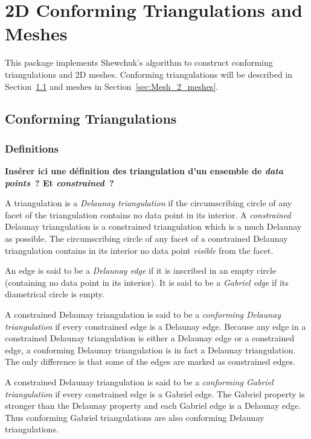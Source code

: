 \chapter{2D Conforming Triangulations and Meshes}
\label{user_chapter_2D_Meshes}


\minitoc

This package implements Shewchuk's algorithm \cite{s-mgdsa-00} to construct
conforming triangulations and 2D meshes. Conforming triangulations will be
described in Section~\ref{sec:Mesh_2_conforming_triangulation} and
meshes in Section~\ref{sec:Mesh_2_meshes}.

\section{Conforming Triangulations}
\label{sec:Mesh_2_conforming_triangulation}

\subsection{Definitions}
\label{sec:Mesh_2_conforming_definitions}

\textbf{Ins\'erer ici une d\'efinition des triangulation d'un ensemble de
  \textit{data points}~? Et \textit{constrained}~?}

A triangulation is a \emph{Delaunay triangulation} if the circumscribing
circle of any facet of the triangulation contains no data point in its
interior. A \emph{constrained} Delaunay triangulation is a constrained
triangulation which is a much Delaunay as possible. The circumscribing
circle of any facet of a constrained Delaunay triangulation contains in its
interior no data point \emph{visible} from the facet.

An edge is said to be a \emph{Delaunay edge} if it is inscribed in an empty
circle (containing no data point in its interior). It is said to be a
\emph{Gabriel edge} if its diametrical circle is empty.

A constrained Delaunay triangulation is said to be a \emph{conforming
  Delaunay triangulation} if every constrained edge is a Delaunay edge.
Because any edge in a constrained Delaunay triangulation is either a
Delaunay edge or a constrained edge, a conforming Delaunay triangulation is
in fact a Delaunay triangulation. The only difference is that some of the
edges are marked as constrained edges.

A constrained Delaunay triangulation is said to be a \emph{conforming
  Gabriel triangulation} if every constrained edge is a Gabriel edge. The
Gabriel property is stronger than the Delaunay property and each Gabriel
edge is a Delaunay edge. Thus conforming Gabriel triangulations are also
conforming Delaunay triangulations.

